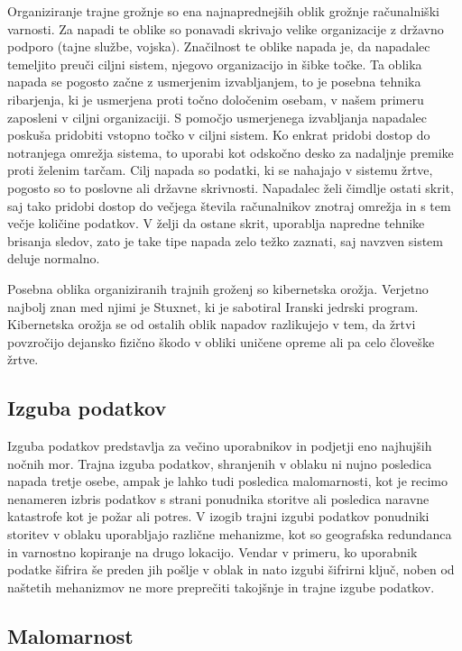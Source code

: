 \documentclass[12pt,a4paper,openany,tikz]{book}
\theoremstyle{plain}
\theoremstyle{definition}
\begin{document}
Organiziranje trajne grožnje so ena najnaprednejših oblik grožnje računalniški varnosti. Za napadi te oblike so ponavadi skrivajo velike organizacije z državno podporo (tajne službe, vojska). Značilnost te oblike napada je, da napadalec temeljito preuči ciljni sistem, njegovo organizacijo in šibke točke. Ta oblika napada se pogosto začne z usmerjenim izvabljanjem, to je posebna tehnika ribarjenja, ki je usmerjena proti točno določenim osebam, v našem primeru zaposleni v ciljni organizaciji. S pomočjo usmerjenega izvabljanja napadalec poskuša pridobiti vstopno točko v ciljni sistem. Ko enkrat pridobi dostop do notranjega omrežja sistema, to uporabi kot odskočno desko za nadaljnje premike proti želenim tarčam. Cilj napada so podatki, ki se nahajajo v sistemu žrtve, pogosto so to poslovne ali državne skrivnosti. Napadalec želi čimdlje ostati skrit, saj tako pridobi dostop do večjega števila računalnikov znotraj omrežja in s tem večje količine podatkov. V želji da ostane skrit, uporablja napredne tehnike brisanja sledov, zato je take tipe napada zelo težko zaznati, saj navzven sistem deluje normalno.

Posebna oblika organiziranih trajnih groženj so kibernetska orožja. Verjetno najbolj znan med njimi je Stuxnet, ki je sabotiral Iranski jedrski program. Kibernetska orožja se od ostalih oblik napadov razlikujejo v tem, da žrtvi povzročijo dejansko fizično škodo v obliki uničene opreme ali pa celo človeške žrtve.

\subsection{Izguba podatkov}
\label{sub:Izguba podatkov}

Izguba podatkov predstavlja za večino uporabnikov in podjetji eno najhujših nočnih mor. Trajna izguba podatkov, shranjenih v oblaku ni nujno posledica napada tretje osebe, ampak je lahko tudi posledica malomarnosti, kot je recimo nenameren izbris podatkov s strani ponudnika storitve ali posledica naravne katastrofe kot je požar ali potres. V izogib trajni izgubi podatkov ponudniki storitev v oblaku uporabljajo različne mehanizme, kot so geografska redundanca in varnostno kopiranje na drugo lokacijo. Vendar v primeru, ko uporabnik podatke šifrira še preden jih pošlje v oblak in nato izgubi šifrirni ključ, noben od naštetih mehanizmov ne more preprečiti takojšnje in trajne izgube podatkov.

\subsection{Malomarnost}
\label{sub:Malomarnost}
\end{document}
